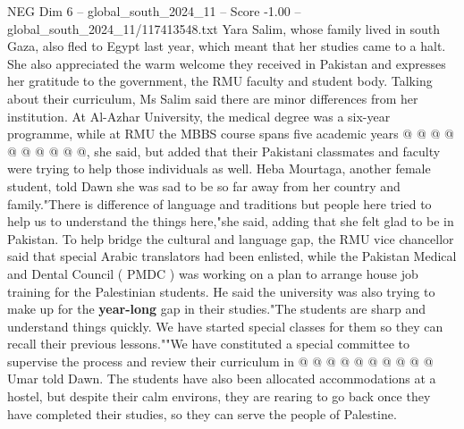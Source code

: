 \begin{textsample}{NEG Dim 6 – global\_south\_2024\_11 – Score -1.00 – global\_south\_2024\_11/117413548.txt}
Yara Salim, whose family lived in south Gaza, also fled to Egypt last year, which meant that her studies came to a halt.
She also appreciated the warm welcome they received in Pakistan and expresses her gratitude to the government, the RMU faculty and student body.
Talking about their curriculum, Ms Salim said there are minor differences from her institution.
At Al-Azhar University, the medical degree was a six-year programme, while at RMU the MBBS course spans five academic years @ @ @ @ @ @ @ @ @ @, she said, but added that their Pakistani classmates and faculty were trying to help those individuals as well.
Heba Mourtaga, another female student, told Dawn she was sad to be so far away from her country and family."There is difference of language and traditions but people here tried to help us to understand the things here,"she said, adding that she felt glad to be in Pakistan.
To help bridge the cultural and language gap, the RMU vice chancellor said that special Arabic translators had been enlisted, while the Pakistan Medical and Dental Council ( PMDC ) was working on a plan to arrange house job training for the Palestinian students.
He said the university was also trying to make up for the \textbf{year-long} gap in their studies."The students are sharp and understand things quickly.
We have started special classes for them so they can recall their previous lessons.""We have constituted a special committee to supervise the process and review their curriculum in @ @ @ @ @ @ @ @ @ @ Umar told Dawn.
The students have also been allocated accommodations at a hostel, but despite their calm environs, they are rearing to go back once they have completed their studies, so they can serve the people of Palestine.

\end{textsample}
